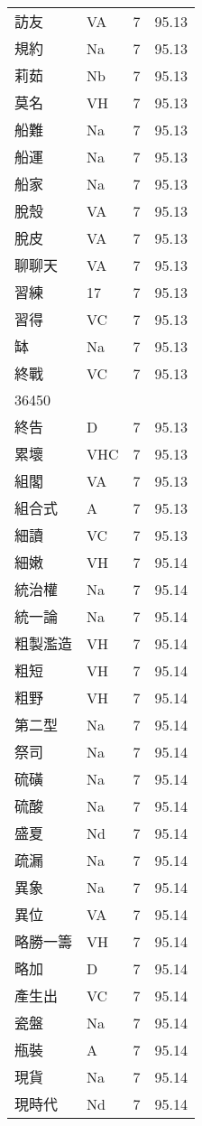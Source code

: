 \documentclass[twocolumn]{book}
\begin{document}
\begin{supertabular}{llrr}
訪友 & VA & 7 &  95.13\\
規約 & Na & 7 &  95.13\\
莉茹 & Nb & 7 &  95.13\\
莫名 & VH & 7 &  95.13\\
船難 & Na & 7 &  95.13\\
船運 & Na & 7 &  95.13\\
船家 & Na & 7 &  95.13\\
脫殼 & VA & 7 &  95.13\\
脫皮 & VA & 7 &  95.13\\
聊聊天 & VA & 7 &  95.13\\
習練 & 17 & 7 &  95.13\\
習得 & VC & 7 &  95.13\\
缽 & Na & 7 &  95.13\\
終戰 & VC & 7 &  95.13\\
36450\\
終告 & D & 7 &  95.13\\
累壞 & VHC & 7 &  95.13\\
組閣 & VA & 7 &  95.13\\
組合式 & A & 7 &  95.13\\
細讀 & VC & 7 &  95.13\\
細嫩 & VH & 7 &  95.14\\
統治權 & Na & 7 &  95.14\\
統一論 & Na & 7 &  95.14\\
粗製濫造 & VH & 7 &  95.14\\
粗短 & VH & 7 &  95.14\\
粗野 & VH & 7 &  95.14\\
第二型 & Na & 7 &  95.14\\
祭司 & Na & 7 &  95.14\\
硫磺 & Na & 7 &  95.14\\
硫酸 & Na & 7 &  95.14\\
盛夏 & Nd & 7 &  95.14\\
疏漏 & Na & 7 &  95.14\\
異象 & Na & 7 &  95.14\\
異位 & VA & 7 &  95.14\\
略勝一籌 & VH & 7 &  95.14\\
略加 & D & 7 &  95.14\\
產生出 & VC & 7 &  95.14\\
瓷盤 & Na & 7 &  95.14\\
瓶裝 & A & 7 &  95.14\\
現貨 & Na & 7 &  95.14\\
現時代 & Nd & 7 &  95.14\\

\end{supertabular}
\end{document}
